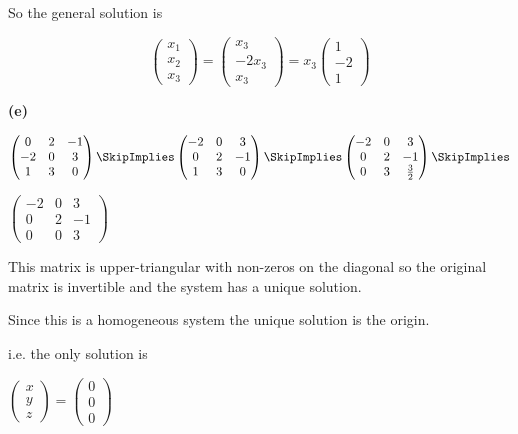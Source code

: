 \documentclass[oneside,12pt]{amsart}
\begin{document}
So the general solution is

$$
\begin{pmatrix}
 x_1 \\ x_2 \\ x_3
\end{pmatrix}
=
\begin{pmatrix}
 x_3 \\ -2 x_3 \\ x_3
\end{pmatrix}
=
x_3
\begin{pmatrix}
1 \\ -2 \\ 1
\end{pmatrix}
$$

\bigskip

\textbf{(e)}

\bigskip

$
\begin{pmatrix}
0 & 2 & -1 \\
-2 & 0 & 3 \\
1 & 3 & 0
\end{pmatrix}
\SkipImplies
\begin{pmatrix}
-2 & 0 & 3 \\
0 & 2 & -1 \\
1 & 3 & 0
\end{pmatrix}
\SkipImplies
\begin{pmatrix}
-2 & 0 & 3 \\
0 & 2 & -1 \\
0 & 3 & \frac{3}{2}
\end{pmatrix}
\SkipImplies
$

\bigskip

$
\begin{pmatrix}
-2 & 0 & 3  \\
0  & 2 & -1 \\
0  & 0 & 3
\end{pmatrix}
$

\bigskip

This matrix is upper-triangular with non-zeros on the diagonal so the
original matrix is invertible and the system has a unique solution.

Since this is a homogeneous system the unique solution is the origin.

i.e. the only solution is

$
\begin{pmatrix}
x \\ y \\ z
\end{pmatrix}
=
\begin{pmatrix}
0 \\ 0 \\ 0
\end{pmatrix}
$
\end{document}
